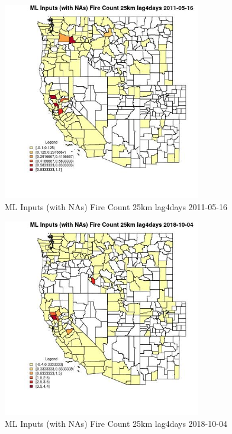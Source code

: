 \begin{figure} 
\centering  
\includegraphics[width=0.77\textwidth]{Code_Outputs/Report_ML_input_PM25_Step4_part_f_de_duplicated_aves_prioritize_24hr_obswNAs_CountyFire_Count_25km_lag4daysMean2011-05-16.jpg} 
\caption{\label{fig:Report_ML_input_PM25_Step4_part_f_de_duplicated_aves_prioritize_24hr_obswNAsCountyFire_Count_25km_lag4daysMean2011-05-16}ML Inputs (with NAs) Fire Count 25km lag4days 2011-05-16} 
\end{figure} 
 

\clearpage 

\begin{figure} 
\centering  
\includegraphics[width=0.77\textwidth]{Code_Outputs/Report_ML_input_PM25_Step4_part_f_de_duplicated_aves_prioritize_24hr_obswNAs_CountyFire_Count_25km_lag4daysMean2018-10-04.jpg} 
\caption{\label{fig:Report_ML_input_PM25_Step4_part_f_de_duplicated_aves_prioritize_24hr_obswNAsCountyFire_Count_25km_lag4daysMean2018-10-04}ML Inputs (with NAs) Fire Count 25km lag4days 2018-10-04} 
\end{figure} 
 

